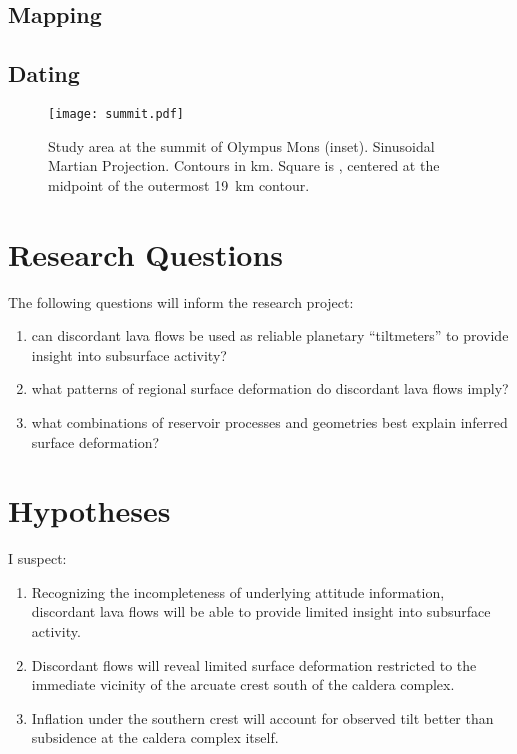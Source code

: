 \subsection{Mapping}
\subsection{Dating}

\begin{figure}
    \centering
    \texttt{[image: summit.pdf]}
    \caption[Study area: Olympus Mons summit]{Study area at the summit of Olympus Mons (inset). Sinusoidal Martian Projection. Contours in \unit{km}. Square is , centered at the midpoint of the outermost \qty{19}{\km} contour.}\label{fig:summit}
\end{figure}

\section{Research Questions}

The following questions will inform the research project: 
\begin{enumerate}
    \item can discordant lava flows be used as reliable planetary ``tiltmeters'' to provide insight into subsurface activity?
    \item what patterns of regional surface deformation do discordant lava flows imply?
    \item what combinations of reservoir processes and geometries best explain inferred surface deformation?
\end{enumerate}

\section{Hypotheses}

I suspect:
\begin{enumerate}
    \item Recognizing the incompleteness of underlying attitude information, discordant lava flows will be able to provide limited insight into subsurface activity.
    \item Discordant flows will reveal limited surface deformation restricted to the immediate vicinity of the arcuate crest south of the caldera complex.
    \item Inflation under the southern crest will account for observed tilt better than subsidence at the caldera complex itself. 
\end{enumerate}

